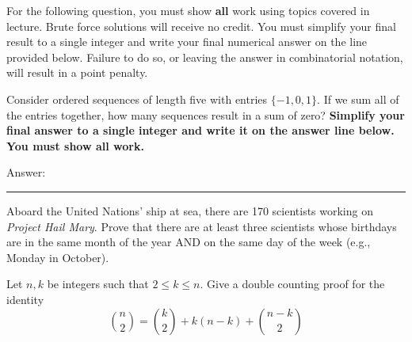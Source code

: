 \documentclass[11pt,addpoints]{exam}
\begin{document}
\begin{questions}

\newpage
For the following question, you must show \textbf{all} work using topics covered in lecture. Brute force solutions will receive no credit. You must simplify your final result to a single integer and write your final numerical answer on the line provided below. Failure to do so, or leaving the answer in combinatorial notation, will result in a point penalty.

\question[12]
Consider ordered sequences of length five with entries $\{-1,0,1\}$. If we sum all of the entries together, how many sequences result in a sum of zero? \textbf{Simplify your final answer to a single integer and write it on the answer line below. You must show all work.}


Answer: \rule{4cm}{0.15mm} \hspace{1cm}



\newpage
\question[16] Aboard the United Nations' ship at sea, there are 170 scientists working on \textit{Project Hail Mary}. Prove that there are at least three scientists whose birthdays are in the same month of the year AND on the same day of the week (e.g., Monday in October).

\newpage



 
\question[15] Let $n, k$ be integers such that $2\leq k\leq n$. Give a double counting proof for the identity
    \[
    \binom{n }{2} = \binom{k }{2} + k(n-k)+\binom{n-k}{2}
    \]








\end{questions}
\end{document}
